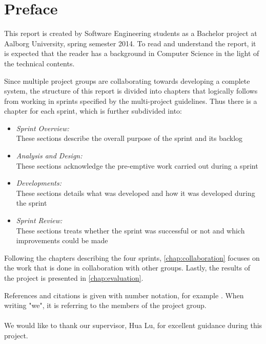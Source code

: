 \newcommand{\headerPreface}{Preface}
\cleardoublepage
{}
\pdfbookmark{\headerPreface}{chap:preface}
\chapter*{\headerPreface}\label{chap:preface}
This report is created by Software Engineering students as a Bachelor project at Aalborg University, spring semester 2014.
To read and understand the report, it is expected that the reader has a background in Computer Science in the light of the technical contents.


Since multiple project groups are collaborating towards developing a complete system, the structure of this report is divided into chapters that logically follows from working in sprints specified by the multi-project guidelines.
Thus there is a chapter for each sprint, which is further subdivided into:

\begin{itemize}
\item \textit{Sprint Overview:}\\
These sections describe the overall purpose of the sprint and its backlog
\item \textit{Analysis and Design:}\\
These sections acknowledge the pre-emptive work carried out during a sprint
\item \textit{Developments:}\\
These sections details what was developed and how it was developed during the sprint 
\item \textit{Sprint Review:}\\
These sections treats whether the sprint was successful or not and which improvements could be made
\end{itemize}

Following the chapters describing the four sprints, \cref{chap:collaboration} focuses on the work that is done in collaboration with other groups.
Lastly, the results of the project is presented in \cref{chap:evaluation}.

References and citations is given with number notation, for example \citet{launcher2012}. 
When writing "we", it is referring to the members of the project group.\\
\mbox{}\\
We would like to thank our supervisor, Hua Lu, for excellent guidance during this project.
